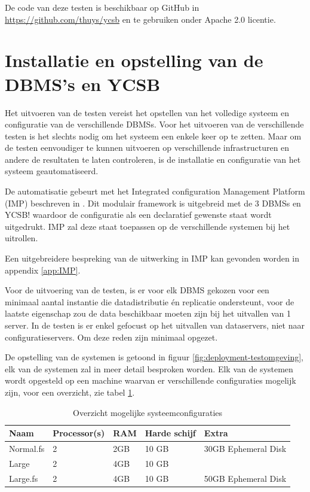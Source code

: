 De code van deze testen is beschikbaar op GitHub in \url{https://github.com/thuys/ycsb} en te gebruiken onder Apache 2.0 licentie. 

\section{Installatie en opstelling van de DBMS's en YCSB}
Het uitvoeren van de testen vereist het opstellen van het volledige systeem en configuratie van de verschillende \glspl{DBMS}. Voor het uitvoeren van de verschillende testen is het slechts nodig om het systeem een enkele keer op te zetten. Maar om de testen eenvoudiger te kunnen uitvoeren op verschillende infrastructuren en andere de resultaten te laten controleren, is de installatie en configuratie van het systeem geautomatiseerd. 

De automatisatie gebeurt met het Integrated configuration Management Platform (\gls{IMP}) beschreven in \cite{KULeuven-453199}. Dit modulair framework is uitgebreid met de 3 \glspl{DBMS} en YCSB! waardoor de configuratie als een declaratief gewenste staat wordt uitgedrukt. \gls{IMP} zal deze staat toepassen op de verschillende systemen bij het uitrollen. 

Een uitgebreidere bespreking van de uitwerking in IMP kan gevonden worden in appendix \ref{app:IMP}. 

Voor de uitvoering van de testen, is er voor elk \gls{DBMS} gekozen voor een minimaal aantal instantie die datadistributie én replicatie ondersteunt, voor de laatste eigenschap zou de data beschikbaar moeten zijn bij het uitvallen van 1 server. In de testen is er enkel gefocust op het uitvallen van dataservers, niet naar configuratieservers. Om deze reden zijn minimaal opgezet. 

De opstelling van de systemen is getoond in figuur \ref{fig:deployment-testomgeving}, elk van de systemen zal in meer detail besproken worden. Elk van de systemen wordt opgesteld op een machine waarvan er verschillende configuraties mogelijk zijn, voor een overzicht, zie tabel \ref{table:systeemconfiguraties}. 
\begin{table}[h!]
	\centering
	\begin{tabular}{l| l l l l}
	\textbf{Naam} & \textbf{Processor(s)} & \textbf{RAM} & \textbf{Harde schijf} & \textbf{Extra} \\
	\hline
	Normal.fs & 2 & 2GB &  10 GB & 30GB Ephemeral Disk \\ 
	Large & 2 & 4GB &  10 GB & \\
	Large.fs & 2 & 4GB &  10 GB & 50GB Ephemeral Disk\\
	\end{tabular}
	\caption{Overzicht mogelijke systeemconfiguraties}
	\label{table:systeemconfiguraties}
\end{table}

